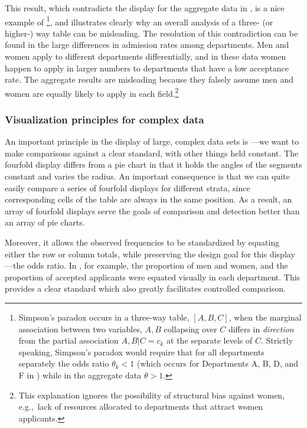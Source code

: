 \documentclass[10pt,krantz2]{krantz}\usepackage[]{graphicx}\usepackage[]{color}
\begin{document}
This result, which contradicts the display for the aggregate data in
, is a nice example of
%
\footnote{Simpson's paradox \citep{Simpson:51} occurs in a three-way
table, $[A, B, C]$, when the marginal association between two variables,
$A, B$ collapsing over $C$ differs in \emph{direction} from the partial
association $A, B | C= c_k$ at the separate levels of $C$.
Strictly speaking, Simpson's paradox would require that for all
departments separately the odds ratio $\theta_k < 1$
(which occurs for Departments A, B, D, and F in )
while in the aggregate data $\theta > 1$.
},
and illustrates clearly why an overall analysis of a three- (or higher-)
way table can be misleading.
The resolution of this contradiction can be found in the large
differences in admission rates among departments.  Men and women
apply to different departments differentially, and in these data
women happen to apply in larger numbers to departments that have a low
acceptance rate.  The aggregate results are misleading because they
falsely assume men and women are equally likely to apply in each
field.\footnote{This explanation ignores the possibility of structural bias
against women, e.g.,\ lack of resources allocated to departments that
attract women applicants.}

\subsubsection{Visualization principles for complex data}
An important principle in the display of large, complex data sets
is ---we want to make comparisons
against a clear standard, with
other things held constant.
The fourfold display
differs from a pie chart in that it holds the
angles of the segments constant and varies the radius.
An important consequence is that we can quite easily compare a
series of fourfold displays for different strata, since corresponding
cells of the table are always in the same position.
As a result, an array of fourfold displays serve the goals of comparison and
detection better than an array of pie charts.

Moreover, it allows the observed frequencies to be standardized
by equating either the row or column totals, while preserving
the design goal for this display---the odds ratio.
In , for example,
the proportion of men and women, and the proportion
of accepted applicants were equated visually in each department.
This provides a clear standard which
also greatly facilitates controlled comparison.
\end{document}
